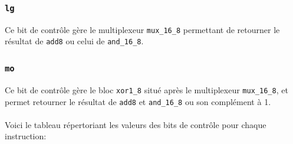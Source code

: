\documentclass[11pt, a4paper, twoside, titlepage]{article}
\begin{document}
\subsubsection{\texttt{lg}}
Ce bit de contrôle gère le multiplexeur \texttt{mux\_16\_8} permettant de retourner le résultat de \texttt{add8} ou celui de \texttt{and\_16\_8}.

\subsubsection{\texttt{mo}}
Ce bit de contrôle gère le bloc \texttt{xor1\_8} situé après le multiplexeur \texttt{mux\_16\_8}, et permet retourner le résultat de \texttt{add8} et \texttt{and\_16\_8} ou son complément à 1.\\
\\
Voici le tableau répertoriant les valeurs des bits de contrôle pour chaque instruction:
\end{document}
